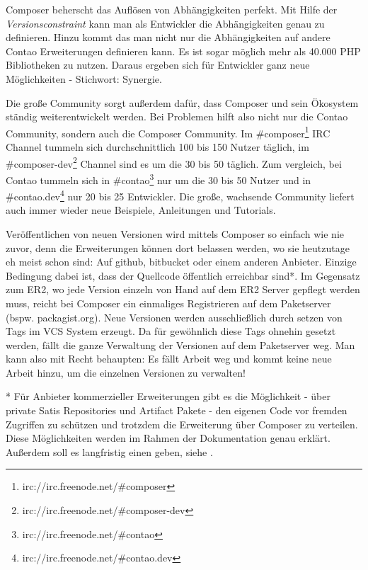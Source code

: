 \documentclass[
paper=a4,
draft=false,%
fontsize=10pt%
]{scrartcl}
\begin{document}
Composer beherscht das Auflösen von Abhängigkeiten perfekt. Mit Hilfe der \textit{Versionsconstraint} kann man als Entwickler die Abhängigkeiten genau zu definieren. Hinzu kommt das man nicht nur die Abhängigkeiten auf andere Contao Erweiterungen definieren kann. Es ist sogar möglich mehr als 40.000 PHP Bibliotheken zu nutzen. Daraus ergeben sich für Entwickler ganz neue Möglichkeiten - Stichwort: Synergie.

Die große Community sorgt außerdem dafür, dass Composer und sein Ökosystem ständig weiterentwickelt werden. Bei Problemen hilft also nicht nur die Contao Community, sondern auch die Composer Community. Im \#composer\footnote{irc://irc.freenode.net/\#composer} IRC Channel tummeln sich durchschnittlich 100 bis 150 Nutzer täglich, im \#composer-dev\footnote{irc://irc.freenode.net/\#composer-dev} Channel sind es um die 30 bis 50 täglich. Zum vergleich, bei Contao tummeln sich in \#contao\footnote{irc://irc.freenode.net/\#contao} nur um die 30 bis 50 Nutzer und in \#contao.dev\footnote{irc://irc.freenode.net/\#contao.dev} nur 20 bis 25 Entwickler. Die große, wachsende Community liefert auch immer wieder neue  Beispiele, Anleitungen und Tutorials.

Veröffentlichen von neuen Versionen wird mittels Composer so einfach wie nie zuvor, denn die Erweiterungen können dort belassen werden, wo sie heutzutage eh meist schon sind: Auf github, bitbucket oder einem anderen Anbieter. Einzige Bedingung dabei ist, dass der Quellcode öffentlich erreichbar sind*. Im Gegensatz zum ER2, wo jede Version einzeln von Hand auf dem ER2 Server gepflegt werden muss, reicht bei Composer ein einmaliges Registrieren auf dem Paketserver (bspw. packagist.org). Neue Versionen werden ausschließlich durch setzen von Tags im VCS System erzeugt. Da für gewöhnlich diese Tags ohnehin gesetzt werden, fällt die ganze Verwaltung der Versionen auf dem Paketserver weg. Man kann also mit Recht behaupten: Es fällt Arbeit weg und kommt keine neue Arbeit hinzu, um die einzelnen Versionen zu verwalten!

\begin{info}
* Für Anbieter kommerzieller Erweiterungen gibt es die Möglichkeit - über private Satis Repositories und Artifact Pakete - den eigenen Code vor fremden Zugriffen zu schützen und trotzdem die Erweiterung über Composer zu verteilen. Diese Möglichkeiten werden im Rahmen der Dokumentation genau erklärt. Außerdem soll es langfristig einen  geben, siehe .
\end{info}
\end{document}
